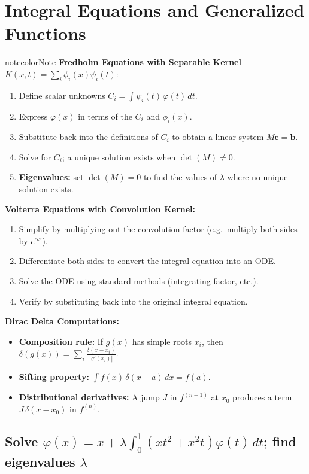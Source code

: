 \documentclass[a4paper,11pt]{article} %
\newenvironment{notebox}[1][]{\begin{custombox}[#1]{notecolor}{Note}}{\end{custombox}}
\begin{document}
\section{Integral Equations and Generalized Functions}
\vspace{-0.5cm}
\begin{notebox}[title={General Procedure: Integral Equations \& Dirac Delta}]
\textbf{Fredholm Equations with Separable Kernel} $K(x,t)=\sum_i \phi_i(x)\psi_i(t)$:
\begin{enumerate}
    \item Define scalar unknowns $C_i = \int \psi_i(t)\,\varphi(t)\,dt$.
    \item Express $\varphi(x)$ in terms of the $C_i$ and $\phi_i(x)$.
    \item Substitute back into the definitions of $C_i$ to obtain a linear system $M\mathbf{c} = \mathbf{b}$.
    \item Solve for $C_i$; a unique solution exists when $\det(M)\ne 0$.
    \item \textbf{Eigenvalues:} set $\det(M)=0$ to find the values of $\lambda$ where no unique solution exists.
\end{enumerate}
\textbf{Volterra Equations with Convolution Kernel:}
\begin{enumerate}
    \item Simplify by multiplying out the convolution factor (e.g.\ multiply both sides by $e^{\alpha x}$).
    \item Differentiate both sides to convert the integral equation into an ODE.
    \item Solve the ODE using standard methods (integrating factor, etc.).
    \item Verify by substituting back into the original integral equation.
\end{enumerate}
\textbf{Dirac Delta Computations:}
\begin{itemize}
    \item \textbf{Composition rule:} If $g(x)$ has simple roots $x_i$, then $\delta(g(x))=\sum_i \frac{\delta(x-x_i)}{|g'(x_i)|}$.
    \item \textbf{Sifting property:} $\int f(x)\,\delta(x-a)\,dx = f(a)$.
    \item \textbf{Distributional derivatives:} A jump $J$ in $f^{(n-1)}$ at $x_0$ produces a term $J\,\delta(x-x_0)$ in $f^{(n)}$.
\end{itemize}
\end{notebox}

\subsection{\texorpdfstring{Solve $\varphi(x)=x+\lambda\int_0^1(xt^2+x^2t)\varphi(t)\,dt$; find eigenvalues $\lambda$}{Fredholm IE with separable kernel; reduce to $2\times 2$ linear system; eigenvalues from $\det M=0$}}
\end{document}
